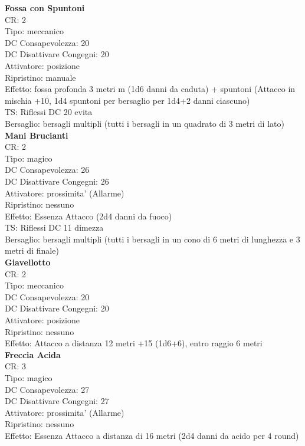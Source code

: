\documentclass[a4paper,11pt,twoside,openany]{dndbook}
\begin{document}
\begin{multicols}{2}
\textbf{Fossa con Spuntoni}\\
CR: 2 \\
Tipo: meccanico \\
DC Consapevolezza: 20 \\
DC Disattivare Congegni: 20 \\
Attivatore: posizione \\
Ripristino: manuale \\
Effetto: fossa profonda 3 metri m (1d6 danni da caduta) + spuntoni (Attacco in mischia +10, 1d4 spuntoni per bersaglio per 1d4+2 danni ciascuno) \\
TS: Riflessi DC 20 evita \\
Bersaglio: bersagli multipli (tutti i bersagli in un quadrato di 3 metri di lato)\\

\textbf{Mani Brucianti}\\
CR: 2 \\
Tipo: magico \\
DC Consapevolezza: 26 \\
DC Disattivare Congegni: 26 \\
Attivatore: prossimita' (Allarme) \\
Ripristino: nessuno \\
Effetto: Essenza Attacco (2d4 danni da fuoco) \\
TS: Riflessi DC 11 dimezza \\
Bersaglio: bersagli multipli (tutti i bersagli in un cono di 6 metri di lunghezza e 3 metri di finale)\\

\textbf{Giavellotto}\\
CR: 2 \\
Tipo: meccanico \\
DC Consapevolezza: 20 \\
DC Disattivare Congegni: 20 \\
Attivatore: posizione \\
Ripristino: nessuno \\
Effetto: Attacco a distanza 12 metri +15 (1d6+6), entro raggio 6 metri\\

\textbf{Freccia Acida}\\
CR: 3 \\
Tipo: magico \\
DC Consapevolezza: 27 \\
DC Disattivare Congegni: 27 \\
Attivatore: prossimita' (Allarme) \\
Ripristino: nessuno \\
Effetto: Essenza Attacco a distanza di 16 metri (2d4 danni da acido per 4 round)\\


\end{multicols}
\end{document}
